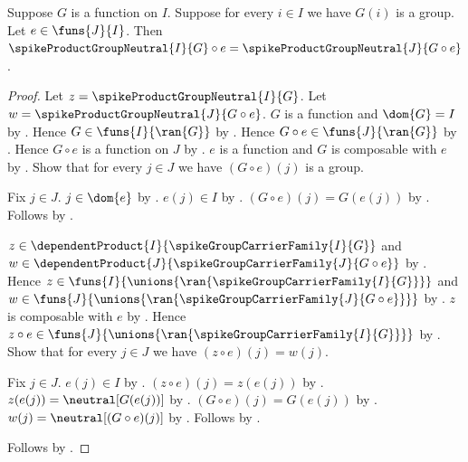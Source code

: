 \begin{proposition}\label{spike_pulled_back_group_neutral_section}
    Suppose $G$ is a function on $I$.
    Suppose for every $i\in I$ we have $G(i)$ is a group.
    Let $e\in\funs{J}{I}$.
    Then
        $\spikeProductGroupNeutral{I}{G}\circ e
            =\spikeProductGroupNeutral{J}{G\circ e}$.
\end{proposition}
\begin{proof}
    Let $z=\spikeProductGroupNeutral{I}{G}$.
    Let $w=\spikeProductGroupNeutral{J}{G\circ e}$.
    $G$ is a function and $\dom{G}=I$ by \auto.
    Hence $G\in\funs{I}{\ran{G}}$ by
        .
    Hence $G\circ e\in\funs{J}{\ran{G}}$ by .
    Hence $G\circ e$ is a function on $J$ by
        .
    $e$ is a function and $G$ is composable with $e$ by
        .
    Show that for every $j\in J$ we have
        $(G\circ e)(j)$ is a group.
    \begin{subproof}
        Fix $j\in J$.
        $j\in\dom{e}$ by .
        $e(j)\in I$ by .
        $(G\circ e)(j)=G(e(j))$ by .
        Follows by \auto.
    \end{subproof}
    $z\in\dependentProduct
        {I}{\spikeGroupCarrierFamily{I}{G}}$ and
        $w\in\dependentProduct
            {J}{\spikeGroupCarrierFamily{J}{G\circ e}}$ by
        .
    Hence $z\in\funs{I}{
        \unions{\ran{\spikeGroupCarrierFamily{I}{G}}}}$ and
        $w\in\funs{J}{
            \unions{\ran{\spikeGroupCarrierFamily{J}{G\circ e}}}}$ by
        .
    $z$ is composable with $e$ by .
    Hence $z\circ e\in\funs{J}{
        \unions{\ran{\spikeGroupCarrierFamily{I}{G}}}}$ by
        .
    Show that for every $j\in J$ we have $(z\circ e)(j)=w(j)$.
    \begin{subproof}
        Fix $j\in J$.
        $e(j)\in I$ by .
        $(z\circ e)(j)=z(e(j))$ by
            .
        $z(e(j))=\neutral[G(e(j))]$ by
            .
        $(G\circ e)(j)=G(e(j))$ by
            .
        $w(j)=\neutral[(G\circ e)(j)]$ by
            .
        Follows by \auto.
    \end{subproof}
    Follows by .
\end{proof}


